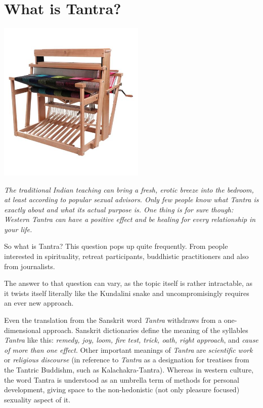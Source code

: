 \section{What is Tantra?}

\begin{center}
\includegraphics[width=7cm]{images/06_what.png}
\end{center}

\textit{The traditional Indian teaching can bring a fresh, erotic breeze into the bedroom, at least according to popular sexual advisors. Only few people know what Tantra is exactly about and what its actual purpose is. One thing is for sure though: Western Tantra can have a positive effect and be healing for every relationship in your life.}

So what is Tantra? This question pops up quite frequently. From people interested in spirituality, retreat participants, buddhistic practitioners and also from journalists.

The answer to that question can vary, as the topic itself is rather intractable, as it twists itself literally like the Kundalini snake and uncompromisingly requires an ever new approach.

Even the translation from the Sanskrit word \textit{Tantra} withdraws from a one-dimensional approach. Sanskrit dictionaries define the meaning of the syllables \textit{Tantra} like this: \textit{remedy, joy, loom, fire test, trick, oath, right approach}, and \textit{cause of more than one effect}. Other important meanings of \textit{Tantra} are \textit{scientific work} or \textit{religious discourse} (in reference to \textit{Tantra} as a designation for treatises from the Tantric Buddishm, such as Kalachakra-Tantra). Whereas in western culture, the word Tantra is understood as an umbrella term of methods for personal development, giving space to the non-hedonistic (not only pleasure focused) sexuality aspect of it.

